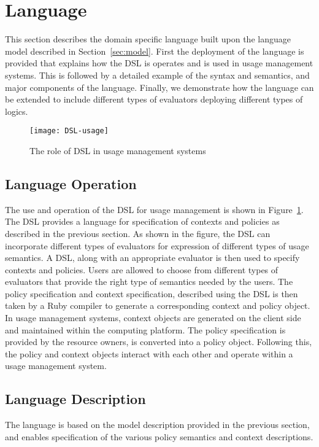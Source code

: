 \section{Language}\label{sec:language}
This section describes the domain specific language built upon the language model described in Section~\ref{sec:model}. First the deployment of the language is provided that explains how the DSL is operates and is used in usage management systems. This is followed by a detailed example of the syntax and semantics, and major components of the language. Finally, we demonstrate how the language can be extended to include different types of evaluators deploying different types of logics. 

\begin{figure}[!t]
\centering
\texttt{[image: DSL-usage]}
\caption{The role of DSL in usage management systems}
\label{fig:DSL-usage}
\end{figure}

\subsection{Language Operation}
The use and operation of the DSL for usage management is shown in Figure~\ref{fig:DSL-usage}. The DSL provides a language for specification of contexts and policies as described in the previous section. As shown in the figure, the DSL can incorporate different types of evaluators for expression of different types of usage semantics. A DSL, along with an appropriate evaluator is then used to specify contexts and policies. Users are allowed to choose from different types of evaluators that provide the right type of semantics needed by the users. The policy specification and context specification, described using the DSL is then taken by a Ruby compiler to generate a corresponding context and policy object. In usage management systems, context objects are generated on the client side and maintained within the computing platform. The policy specification is provided by the resource owners, is converted into a policy object. Following this, the policy and context objects interact with each other and operate within a usage management system.  

\subsection{Language Description}
The language is based on the model description provided in the previous section, and enables specification of the various policy semantics and context descriptions. 

